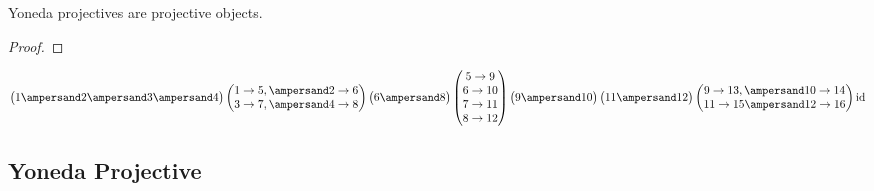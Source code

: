 \begin{lemma}
Yoneda projectives are projective objects.
\begin{proof}
\end{proof}
\end{lemma}

\[
\begin{pmatrix}1 \ampersand 2 \ampersand 3 \ampersand 4\end{pmatrix}
\begin{pmatrix} 1\to5, \ampersand 2\to6 \\ 3\to7, \ampersand 4\to8 \end{pmatrix}
\begin{pmatrix}6 \ampersand 8\end{pmatrix}
\begin{pmatrix}5\to9\\6\to10\\7\to11\\8\to12\end{pmatrix}
\begin{pmatrix}9\ampersand10\end{pmatrix}\begin{pmatrix}11\ampersand12\end{pmatrix}
\begin{pmatrix}9\to13, \ampersand 10\to14\\11\to15 \ampersand 12\to16\end{pmatrix}
\textup{id}
\]

\subsection{Yoneda Projective}

